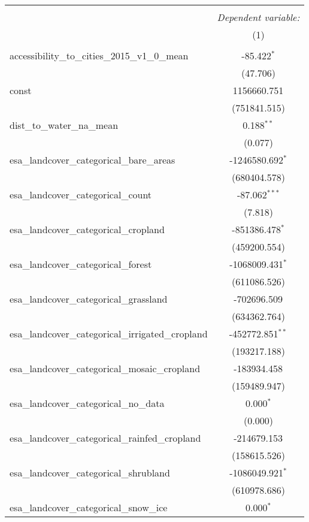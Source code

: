 \begin{table}[!htbp] \centering
\begin{tabular}{@{\extracolsep{5pt}}lc}
\\[-1.8ex]\hline
\hline \\[-1.8ex]
& \multicolumn{1}{c}{\textit{Dependent variable:}} \
\cr \cline{1-2}
\\[-1.8ex] & (1) \\
\hline \\[-1.8ex]
 accessibility_to_cities_2015_v1_0_mean & -85.422$^{*}$ \\
  & (47.706) \\
 const & 1156660.751$^{}$ \\
  & (751841.515) \\
 dist_to_water_na_mean & 0.188$^{**}$ \\
  & (0.077) \\
 esa_landcover_categorical_bare_areas & -1246580.692$^{*}$ \\
  & (680404.578) \\
 esa_landcover_categorical_count & -87.062$^{***}$ \\
  & (7.818) \\
 esa_landcover_categorical_cropland & -851386.478$^{*}$ \\
  & (459200.554) \\
 esa_landcover_categorical_forest & -1068009.431$^{*}$ \\
  & (611086.526) \\
 esa_landcover_categorical_grassland & -702696.509$^{}$ \\
  & (634362.764) \\
 esa_landcover_categorical_irrigated_cropland & -452772.851$^{**}$ \\
  & (193217.188) \\
 esa_landcover_categorical_mosaic_cropland & -183934.458$^{}$ \\
  & (159489.947) \\
 esa_landcover_categorical_no_data & 0.000$^{*}$ \\
  & (0.000) \\
 esa_landcover_categorical_rainfed_cropland & -214679.153$^{}$ \\
  & (158615.526) \\
 esa_landcover_categorical_shrubland & -1086049.921$^{*}$ \\
  & (610978.686) \\
 esa_landcover_categorical_snow_ice & 0.000$^{*}$ \\

\end{tabular}
\end{table}
